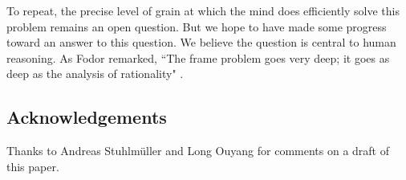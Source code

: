 \documentclass[10pt,letterpaper]{article}
\begin{document}
To repeat, the precise level of grain at which the mind does efficiently solve this problem remains an open question. But we hope to have made some progress toward an answer to this question. We believe the question is central to  human reasoning. As Fodor remarked, ``The frame problem goes very deep; it goes as deep as the analysis of rationality" \citeyearpar{Fodor1987}.


\subsection{Acknowledgements} Thanks to Andreas Stuhlm\"{u}ller and Long Ouyang for comments on a draft of this paper.




\end{document}
